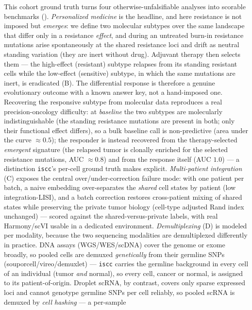 \documentclass{article}
\begin{document}
This cohort ground truth turns four otherwise-unfalsifiable analyses into scorable benchmarks
(). \emph{Personalized medicine} is the headline, and here resistance is not imposed
but \emph{emerges}: we define two molecular subtypes over the same landscape that differ only in a
resistance \emph{effect}, and during an untreated burn-in resistance mutations arise spontaneously at
the shared resistance loci and drift as neutral standing variation (they are inert without drug).
Adjuvant therapy then selects them --- the high-effect (resistant) subtype relapses from its
standing resistant cells while the low-effect (sensitive) subtype, in which the same mutations are
inert, is eradicated (B). The differential response is therefore a genuine
evolutionary outcome with a known answer key, not a hand-imposed one. Recovering the responsive
subtype from molecular data reproduces a real precision-oncology difficulty: at \emph{baseline} the
two subtypes are molecularly indistinguishable (the standing resistance mutations are present in both;
only their functional effect differs), so a bulk baseline call is non-predictive (area under the curve
$\approx0.5$); the responder is instead recovered from the therapy-selected \emph{emergent} signature
(the relapsed tumor is clonally enriched for the selected resistance mutations, AUC $\approx0.8$) and
from the response itself (AUC $1.0$) --- a distinction \texttt{iscc}'s per-cell ground truth makes
explicit. \emph{Multi-patient
integration} (C) exposes the central over/under-correction failure mode: with one
patient per batch, a naive embedding over-separates the \emph{shared} cell states by patient (low
integration-LISI), and a batch correction restores cross-patient mixing of shared states while
preserving the private tumor biology (cell-type adjusted Rand index unchanged) --- scored against the
shared-versus-private labels, with real Harmony/scVI usable in a dedicated environment.
\emph{Demultiplexing} (D) is modeled per modality, because the two sequencing
modalities are demultiplexed differently in practice. DNA assays (WGS/WES/scDNA) cover the genome or
exome broadly, so pooled cells are demuxed \emph{genetically} from their germline SNPs
(souporcell/vireo/demuxlet) --- \texttt{iscc} carries the germline background in every cell of an
individual (tumor \emph{and} normal), so every cell, cancer or normal, is assigned to its
patient-of-origin. Droplet scRNA, by contrast, covers only sparse expressed loci and cannot genotype
germline SNPs per cell reliably, so pooled scRNA is demuxed by \emph{cell hashing} --- a per-sample
\end{document}
